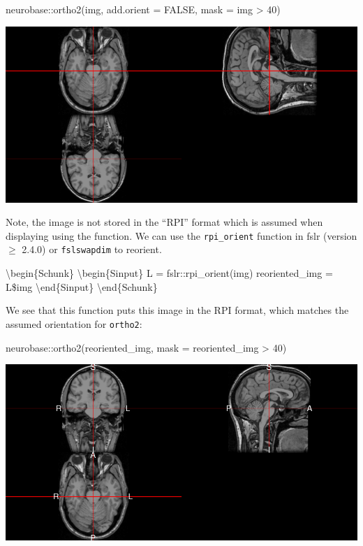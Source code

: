 \begin{Schunk}
\begin{Sinput}
neurobase::ortho2(img, add.orient = FALSE, mask = img > 40)
\end{Sinput}

\includegraphics{Freesurfer_files/figure-latex/mri_plot-1} \end{Schunk}

Note, the image is not stored in the ``RPI'' format which is assumed
when displaying using the   function. We can
use the \texttt{rpi\_orient} function in fslr (version \(\geq\) 2.4.0)
or \texttt{fslswapdim} to reorient.

\textbackslash{}begin\{Schunk\} \textbackslash{}begin\{Sinput\} L =
fslr::rpi\_orient(img) reoriented\_img = L\$img
\textbackslash{}end\{Sinput\} \textbackslash{}end\{Schunk\}

We see that this function puts this image in the RPI format, which
matches the assumed orientation for \texttt{ortho2}:

\begin{Schunk}
\begin{Sinput}
neurobase::ortho2(reoriented_img, mask = reoriented_img > 40)
\end{Sinput}

\includegraphics{Freesurfer_files/figure-latex/mri_plot2-1} \end{Schunk}

